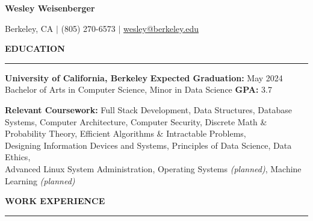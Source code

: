 \documentclass{article}
\begin{document}
\pagestyle{fancy}
\fancyhead{}\fancyfoot{}

\newcommand{\header}[1]{
    \vspace{4mm}
    {\large \noindent \textbf{#1}}
    \vspace{1.5mm}
    \hrule
    \vspace{2mm}
}

\begin{center}

    {\LARGE \textbf{Wesley Weisenberger}}

    \vspace{2mm}

    {\large Berkeley, CA  $\mid$ (805) 270-6573
        $\mid$
        \href{mailto:wesley@berkeley.edu}{wesley@berkeley.edu}

    }

\end{center}


\header{EDUCATION}

\begin{adjustwidth}{1em}{1em}

    \textbf{University of California, Berkeley}
    \hfill
    \textbf{Expected Graduation:} May 2024 \\
    Bachelor of Arts in Computer Science, Minor in Data Science \hfill  \textbf{GPA:} 3.7

    \vspace{2.5mm}

    \textbf{Relevant Coursework:}
        Full Stack Development,
        Data Structures,
        Database Systems,
        Computer Architecture,
        Computer Security,
        Discrete Math \& Probability Theory,
        Efficient Algorithms \& Intractable Problems, \\
        Designing Information Devices and Systems,
        Principles of Data Science,
        Data Ethics, \\
        Advanced Linux System Administration,
        Operating Systems \textit{(planned)},
        Machine Learning \textit{(planned)}

\end{adjustwidth}


\header{WORK EXPERIENCE}
\end{document}
